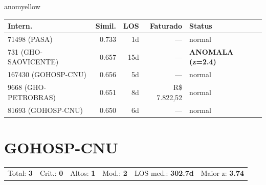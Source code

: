\documentclass[a4paper,10pt]{article}
\begin{document}
\begin{anomalycard}[Internacao 1217 | GHO-UNIMEDVITORIA2 | MODERADO (z=2.03)]{anomyellow}
\begin{tabular}{l r r r l}\toprule\textbf{Intern.} & \textbf{Simil.} & \textbf{LOS} & \textbf{Faturado} & \textbf{Status} \\\midrule
71498 (PASA) & 0.733 & 1d & --- & \textcolor{jcubeblue}{normal} \\
731 (GHO-SAOVICENTE) & 0.657 & 15d & --- & \textcolor{anomred}{\textbf{ANOMALA (z=2.4)}} \\
167430 (GOHOSP-CNU) & 0.656 & 5d & --- & \textcolor{jcubeblue}{normal} \\
9668 (GHO-PETROBRAS) & 0.651 & 8d & R\$ 7.822,52 & \textcolor{jcubeblue}{normal} \\
81693 (GOHOSP-CNU) & 0.650 & 6d & --- & \textcolor{jcubeblue}{normal} \\
\bottomrule\end{tabular}


\end{anomalycard}

\newpage

\clearpage
\section{GOHOSP-CNU}
\begin{tcolorbox}[colback=lightblue,colframe=jcubeblue,title={\textbf{Resumo --- GOHOSP-CNU}}]
\begin{tabular}{ll@{\quad}ll@{\quad}ll}
Total: \textbf{3} &
Crit.: \textcolor{anomred}{\textbf{0}} &
Altos: \textcolor{anomorange}{\textbf{1}} &
Mod.: \textcolor{anomyellow}{\textbf{2}} &
LOS med.: \textbf{302.7d} &
Maior z: \textbf{3.74} \\


\end{tabular}
\end{tcolorbox}
\end{document}
